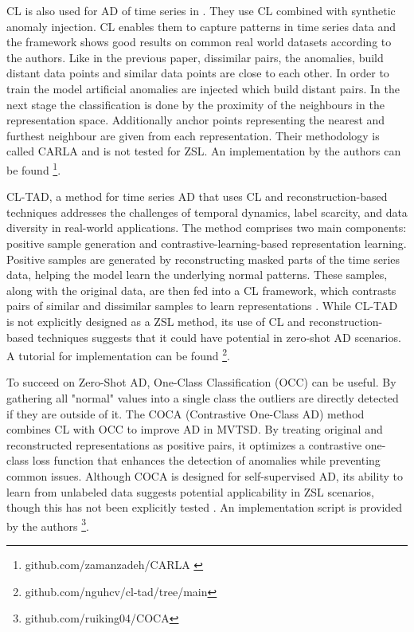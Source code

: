 CL is also used for AD of time series in \cite{darban_carla_2024}. They use CL combined with synthetic anomaly injection. CL enables them to capture patterns in time series data and the framework shows good results on common real world datasets according to the authors. Like in the previous paper, dissimilar pairs, the anomalies, build distant data points and similar data points are close to each other. In order to train the model artificial anomalies are injected which build distant pairs. In the next stage the classification is done by  the proximity of the neighbours in the representation space. Additionally anchor points representing the nearest and furthest neighbour are given from each representation. Their methodology is called CARLA and is not tested for ZSL. An implementation by the authors can be found \footnote{\fussy\tiny github.com/zamanzadeh/CARLA \label{foot_carla}}.

CL-TAD, a method for time series AD that uses CL and reconstruction-based techniques addresses the challenges of temporal dynamics, label scarcity, and data diversity in real-world applications. The method comprises two main components: positive sample generation and contrastive-learning-based representation learning. Positive samples are generated by reconstructing masked parts of the time series data, helping the model learn the underlying normal patterns. These samples, along with the original data, are then fed into a CL framework, which contrasts pairs of similar and dissimilar samples to learn representations \cite{ngu_cl-tad_2023}.
While CL-TAD is not explicitly designed as a ZSL method, its use of CL and reconstruction-based techniques suggests that it could have potential in zero-shot AD scenarios. A tutorial for implementation can be found \footnote{\fussy\tiny github.com/nguhcv/cl-tad/tree/main}.

To succeed on Zero-Shot AD, One-Class Classification (OCC) can be useful.
By gathering all "normal" values into a single class the outliers are directly detected if they are outside of it.
The COCA (Contrastive One-Class AD) method combines CL with OCC to improve AD in MVTSD. By treating original and reconstructed representations as positive pairs, it optimizes a contrastive one-class loss function that enhances the detection of anomalies while preventing common issues. Although COCA is designed for self-supervised AD, its ability to learn from unlabeled data suggests potential applicability in ZSL scenarios, though this has not been explicitly tested \cite{wang_deep_2023}. An implementation script is provided by the authors \footnote{\fussy\tiny github.com/ruiking04/COCA}.

